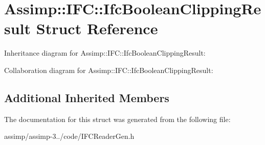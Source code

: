 \hypertarget{struct_assimp_1_1_i_f_c_1_1_ifc_boolean_clipping_result}{\section{Assimp\+:\+:I\+F\+C\+:\+:Ifc\+Boolean\+Clipping\+Result Struct Reference}
\label{struct_assimp_1_1_i_f_c_1_1_ifc_boolean_clipping_result}
}


Inheritance diagram for Assimp\+:\+:I\+F\+C\+:\+:Ifc\+Boolean\+Clipping\+Result\+:


Collaboration diagram for Assimp\+:\+:I\+F\+C\+:\+:Ifc\+Boolean\+Clipping\+Result\+:
\subsection*{Additional Inherited Members}


The documentation for this struct was generated from the following file\+:\begin{DoxyCompactItemize}
\item 
assimp/assimp-\/3../code/I\+F\+C\+Reader\+Gen.\+h\end{DoxyCompactItemize}

